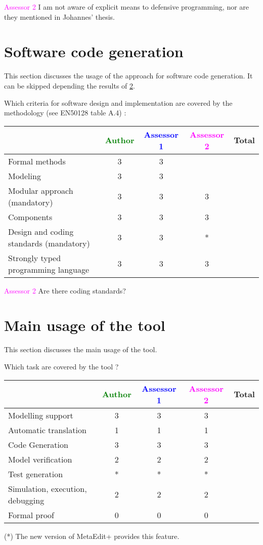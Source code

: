 \textcolor{magenta}{Assessor 2} I am not aware of explicit means to defensive
programming, nor are they mentioned in Johannes' thesis.

\section{Software code generation}
This section discusses the usage of the approach for software code generation.
It can be skipped depending the results of \ref{main_usage}.

Which criteria for software design and implementation are covered by the methodology
(see EN50128 table A.4) :

\begin{tabular}{|l | c | c | c | c|}
\hline
& \textcolor{green}{Author} & \textcolor{blue}{Assessor 1} & \textcolor{magenta}{Assessor 2} & Total \\
\hline
Formal methods  &3 &3 & &  \\
\hline 
Modeling  &3 &3 & &  \\
\hline
Modular approach (mandatory) &3 &3 & 3&  \\
\hline
Components &3 &3 & 3&  \\
\hline
Design and coding standards (mandatory) &3 &3 & *&  \\
\hline
Strongly typed programming language &3 &3 & 3&  \\
\hline

\end{tabular}

\textcolor{magenta}{Assessor 2} Are there coding standards?

\section{Main usage of the tool}
\label{main_usage}

This section discusses the main usage of the tool.

Which task are covered by the tool ?


\begin{tabular}{|l | c | c | c | c|}
\hline
& \textcolor{green}{Author} & \textcolor{blue}{Assessor 1} & \textcolor{magenta}{Assessor 2} & Total \\
\hline 
Modelling support &3 &3 & 3&  \\
\hline
Automatic translation  &1 &1 & 1& \\
\hline
Code Generation  &3 &3 & 3& \\
\hline
Model verification &2 &2 & 2& \\
\hline
Test generation &* &* & *& \\
\hline
Simulation, execution, debugging &2 &2 & 2& \\
\hline
Formal proof &0 &0 & 0& \\
\hline
\end{tabular}
\begin{author_comment}
(*) The new version of MetaEdit+ provides this feature.
\end{author_comment}

